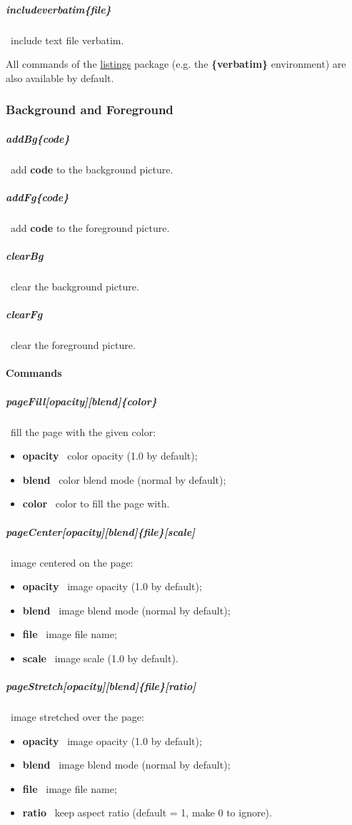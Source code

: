 \documentclass[english,12pt,openany,letterpaper]{book}
\begin{document}
\subparagraph{\bs includeverbatim\{file\}} \dash\ include text file verbatim.

\skipline

All commands of the \href{https://www.ctan.org/pkg/listings}{listings} package (e.g. the \textbf{\{verbatim\}} environment) are also available by default.

\break

\subsubsection{Background and Foreground}

\subparagraph{\bs addBg\{code\}} \dash\ add \textbf{code} to the background picture.

\subparagraph{\bs addFg\{code\}} \dash\ add \textbf{code} to the foreground picture.

\subparagraph{\bs clearBg} \dash\ clear the background picture.

\subparagraph{\bs clearFg} \dash\ clear the foreground picture.

\skipline

\paragraph{Commands}

\subparagraph{\bs pageFill[opacity][blend]\{color\}} \dash\ fill the page with the given color:
\begin{itemize}
	\item \textbf{opacity} \dash\ color opacity (1.0 by default);
	\item \textbf{blend} \dash\ color blend mode (normal by default);
	\item \textbf{color} \dash\ color to fill the page with.
\end{itemize}

\subparagraph{\bs pageCenter[opacity][blend]\{file\}[scale]} \dash\ image centered on the page:
\begin{itemize}
	\item \textbf{opacity} \dash\ image opacity (1.0 by default);
	\item \textbf{blend} \dash\ image blend mode (normal by default);
	\item \textbf{file} \dash\ image file name;
	\item \textbf{scale} \dash\ image scale (1.0 by default).
\end{itemize}

\subparagraph{\bs pageStretch[opacity][blend]\{file\}[ratio]} \dash\ image stretched over the page:
\begin{itemize}
	\item \textbf{opacity} \dash\ image opacity (1.0 by default);
	\item \textbf{blend} \dash\ image blend mode (normal by default);
	\item \textbf{file} \dash\ image file name;
	\item \textbf{ratio} \dash\ keep aspect ratio (default = 1, make 0 to ignore).
\end{itemize}
\end{document}
